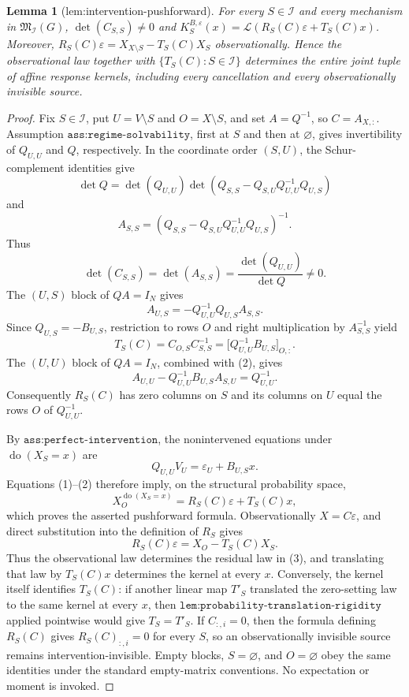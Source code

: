 \documentclass{article}
\newtheorem{lemma}{Lemma}
\begin{document}
\begin{lemma}[lem:intervention-pushforward]\label{lem:intervention-pushforward}
For every \(S\in\mathcal I\) and every mechanism in \(\mathfrak M_{\mathcal I}(G)\), \(\det(C_{S,S})\ne0\) and \(K_S^{B,\varepsilon}(x)=\mathcal L(R_S(C)\varepsilon+T_S(C)x)\). Moreover, \(R_S(C)\varepsilon=X_{X\setminus S}-T_S(C)X_S\) observationally. Hence the observational law together with \(\{T_S(C):S\in\mathcal I\}\) determines the entire joint tuple of affine response kernels, including every cancellation and every observationally invisible source.
\end{lemma}
\begin{proof}
Fix \(S\in\mathcal I\), put \(U=V\setminus S\) and \(O=X\setminus S\), and set \(A=Q^{-1}\), so \(C=A_{X,:}\). Assumption \(\texttt{ass:regime-solvability}\), first at \(S\) and then at \(\varnothing\), gives invertibility of \(Q_{U,U}\) and \(Q\), respectively. In the coordinate order \((S,U)\), the Schur-complement identities give
\[
\det Q=\det(Q_{U,U})\det\!\left(Q_{S,S}-Q_{S,U}Q_{U,U}^{-1}Q_{U,S}\right)
\]
and
\[
A_{S,S}=\left(Q_{S,S}-Q_{S,U}Q_{U,U}^{-1}Q_{U,S}\right)^{-1}.
\]
Thus
\[
\det(C_{S,S})=\det(A_{S,S})=\frac{\det(Q_{U,U})}{\det Q}\ne0. \tag{1}
\]
The \((U,S)\) block of \(QA=I_N\) gives
\[
A_{U,S}=-Q_{U,U}^{-1}Q_{U,S}A_{S,S}.
\]
Since \(Q_{U,S}=-B_{U,S}\), restriction to rows \(O\) and right multiplication by \(A_{S,S}^{-1}\) yield
\[
T_S(C)=C_{O,S}C_{S,S}^{-1}=\bigl[Q_{U,U}^{-1}B_{U,S}\bigr]_{O,:}. \tag{2}
\]
The \((U,U)\) block of \(QA=I_N\), combined with (2), gives
\[
A_{U,U}-Q_{U,U}^{-1}B_{U,S}A_{S,U}=Q_{U,U}^{-1}.
\]
Consequently \(R_S(C)\) has zero columns on \(S\) and its columns on \(U\) equal the rows \(O\) of \(Q_{U,U}^{-1}\).

By \(\texttt{ass:perfect-intervention}\), the nonintervened equations under \(\operatorname{do}(X_S=x)\) are
\[
Q_{U,U}V_U=\varepsilon_U+B_{U,S}x.
\]
Equations (1)--(2) therefore imply, on the structural probability space,
\[
X_O^{\operatorname{do}(X_S=x)}=R_S(C)\varepsilon+T_S(C)x,
\]
which proves the asserted pushforward formula. Observationally \(X=C\varepsilon\), and direct substitution into the definition of \(R_S\) gives
\[
R_S(C)\varepsilon=X_O-T_S(C)X_S. \tag{3}
\]
Thus the observational law determines the residual law in (3), and translating that law by \(T_S(C)x\) determines the kernel at every \(x\). Conversely, the kernel itself identifies \(T_S(C)\): if another linear map \(T'_S\) translated the zero-setting law to the same kernel at every \(x\), then \(\texttt{lem:probability-translation-rigidity}\) applied pointwise would give \(T_S=T'_S\). If \(C_{:,i}=0\), then the formula defining \(R_S(C)\) gives \(R_S(C)_{:,i}=0\) for every \(S\), so an observationally invisible source remains intervention-invisible. Empty blocks, \(S=\varnothing\), and \(O=\varnothing\) obey the same identities under the standard empty-matrix conventions. No expectation or moment is invoked.
\end{proof}
\end{document}
